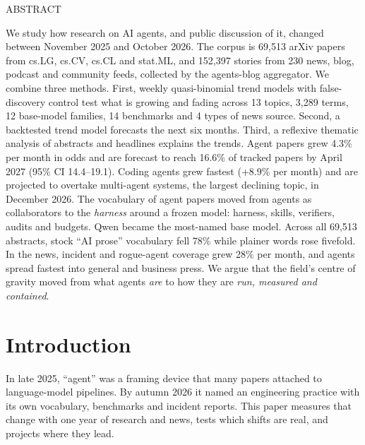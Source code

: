 \documentclass[10.5pt]{article}
\begin{document}
\begin{tcolorbox}[enhanced, colback=lav, colframe=lav, arc=6pt, left=14pt, right=14pt, top=10pt, bottom=10pt]
{\sorasemi\small\color{qpurple}ABSTRACT}\par\vspace{3pt}
\small
We study how research on AI agents, and public discussion of it, changed between November 2025 and October 2026. The corpus is 69,513 arXiv papers from cs.LG, cs.CV, cs.CL and stat.ML, and 152,397 stories from 230 news, blog, podcast and community feeds, collected by the agents-blog aggregator. We combine three methods. First, weekly quasi-binomial trend models with false-discovery control test what is growing and fading across 13 topics, 3,289 terms, 12 base-model families, 14 benchmarks and 4 types of news source. Second, a backtested trend model forecasts the next six months. Third, a reflexive thematic analysis of abstracts and headlines explains the trends. Agent papers grew 4.3\% per month in odds and are forecast to reach 16.6\% of tracked papers by April 2027 (95\% CI 14.4--19.1). Coding agents grew fastest (+8.9\% per month) and are projected to overtake multi-agent systems, the largest declining topic, in December 2026. The vocabulary of agent papers moved from agents as collaborators to the \emph{harness} around a frozen model: harness, skills, verifiers, audits and budgets. Qwen became the most-named base model. Across all 69,513 abstracts, stock \enquote{AI prose} vocabulary fell 78\% while plainer words rose fivefold. In the news, incident and rogue-agent coverage grew 28\% per month, and agents spread fastest into general and business press. We argue that the field's centre of gravity moved from what agents \emph{are} to how they are \emph{run, measured and contained}.
\end{tcolorbox}

\section{Introduction}

In late 2025, \enquote{agent} was a framing device that many papers attached to language-model pipelines. By autumn 2026 it named an engineering practice with its own vocabulary, benchmarks and incident reports. This paper measures that change with one year of research and news, tests which shifts are real, and projects where they lead.
\end{document}
